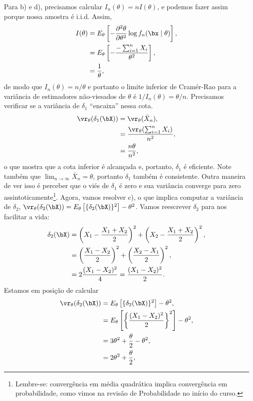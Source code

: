 {Para b) e d), precisamos calcular $I_n(\theta) = nI(\theta)$, e podemos fazer assim porque nossa amostra é i.i.d.
Assim,
\begin{align*}
    I(\theta) &= E_\theta\left[-\frac{\partial^2\theta}{\partial\theta^2}\log f_n(\bx \mid \theta)\right],\\
    &= E_\theta\left[-\frac{-\sum_{i=1}^n X_i}{\theta^2}\right],\\
    &= \frac{1}{\theta},
\end{align*}
de modo que $I_n(\theta) = n/\theta$ e portanto o limite inferior de Cramér-Rao para a variância de estimadores não-viesados de $\theta$ é $1/I_n(\theta) = \theta/n$.
Precisamos verificar se a variância de $\delta_1$ ``encaixa'' nessa cota.
\begin{align*}
    \vr_\theta(\delta_1(\bX)) &= \vr_\theta(\bar{X}_n),\\
    &= \frac{\vr_\theta(\sum_{i=1}^nX_i)}{n^2},\\
    &= \frac{n\theta}{n^2},
\end{align*}
o que mostra que a cota inferior é alcançada e, portanto, $\delta_1$ é eficiente.
Note também que $\lim_{n\to\infty}\bar{X}_n = \theta$, portanto $\delta_1$ também é consistente.
Outra maneira de ver isso é perceber que o viés de $\delta_1$ é zero e sua variância converge para zero assintoticamente\footnote{Lembre-se: convergência em média quadrática implica convergência em probabilidade, como vimos na revisão de Probabilidade no início do curso.}.
Agora, vamos resolver c), o que implica computar a variância de $\delta_2$, $\vr_\theta(\delta_2(\bX)) = E_\theta\left[\{\delta_2(\bX)\}^2\right] -\theta^2$.
Vamos reescrever $\delta_2$ para nos facilitar a vida:
\begin{align*}
    \delta_2(\bX) &= \left(X_1 - \frac{X_1 + X_2}{2}\right)^2 + \left(X_2 - \frac{X_1 + X_2}{2}\right)^2,\\
    &= \left(\frac{X_1 - X_2}{2}\right)^2 + \left(\frac{X_2 - X_1}{2}\right)^2,\\
    &= 2\frac{(X_1-X_2)^2}{4} = \frac{(X_1-X_2)^2}{2}.
\end{align*}
Estamos em posição de calcular
\begin{align*}
\vr_\theta(\delta_2(\bX)) &=  E_\theta\left[\{\delta_2(\bX)\}^2\right] -\theta^2,\\
 &=  E_\theta\left[\left\{\frac{(X_1-X_2)^2}{2}\right\}^2\right] -\theta^2,\\
&= 3\theta^2 + \frac{\theta}{2}-\theta^2,\\
&= 2\theta^2 + \frac{\theta}{2},

\end{align*}}
